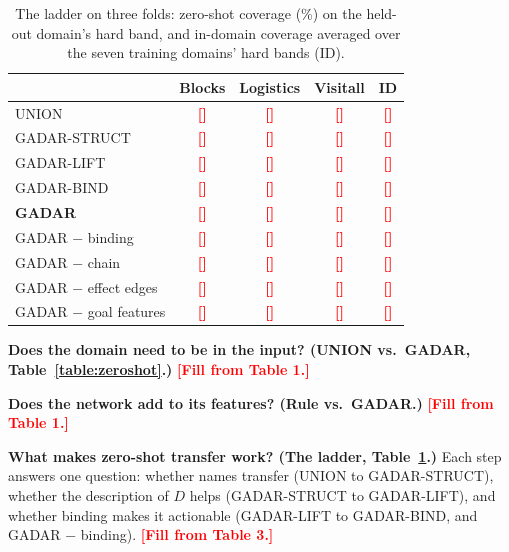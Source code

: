 \documentclass[letterpaper]{article} %
\newcommand{\gadar}{GADAR}                    %
\newcommand{\union}{UNION}                    %
\newcommand{\gstruct}{\gadar{}-STRUCT}        %
\newcommand{\glift}{\gadar{}-LIFT}            %
\newcommand{\gbind}{\gadar{}-BIND}            %
\newcommand{\todonum}[1]{\textcolor{red}{\textbf{[#1]}}}
\begin{document}
\begin{table}[t]
\centering
\small
\caption{The ladder on three folds: zero-shot coverage (\%) on the held-out
domain's hard band, and in-domain coverage averaged over the seven training
domains' hard bands (ID).}
\label{table:ladder}
\setlength{\tabcolsep}{3.5pt}
\begin{tabular}{@{}lcccc@{}}
\toprule
& Blocks & Logistics & Visitall & ID \\
\midrule
\union{}                  & \todonum{} & \todonum{} & \todonum{} & \todonum{} \\
\gstruct{}                & \todonum{} & \todonum{} & \todonum{} & \todonum{} \\
\glift{}                  & \todonum{} & \todonum{} & \todonum{} & \todonum{} \\
\gbind{}                  & \todonum{} & \todonum{} & \todonum{} & \todonum{} \\
\textbf{\gadar{}}         & \todonum{} & \todonum{} & \todonum{} & \todonum{} \\
\midrule
\gadar{} $-$ binding      & \todonum{} & \todonum{} & \todonum{} & \todonum{} \\
\gadar{} $-$ chain        & \todonum{} & \todonum{} & \todonum{} & \todonum{} \\
\gadar{} $-$ effect edges & \todonum{} & \todonum{} & \todonum{} & \todonum{} \\
\gadar{} $-$ goal features& \todonum{} & \todonum{} & \todonum{} & \todonum{} \\
\bottomrule
\end{tabular}
\end{table}


\textbf{Does the domain need to be in the input? (\union{} vs.\ \gadar{},
Table~\ref{table:zeroshot}.)} \todonum{Fill from Table 1.}

\textbf{Does the network add to its features? (Rule vs.\ \gadar{}.)}
\todonum{Fill from Table 1.}

\textbf{What makes zero-shot transfer work? (The ladder,
Table~\ref{table:ladder}.)} Each step answers one question: whether names
transfer (\union{} to \gstruct{}), whether the description of $D$ helps
(\gstruct{} to \glift{}), and whether binding makes it actionable (\glift{}
to \gbind{}, and \gadar{} $-$ binding). \todonum{Fill from Table 3.}
\end{document}
